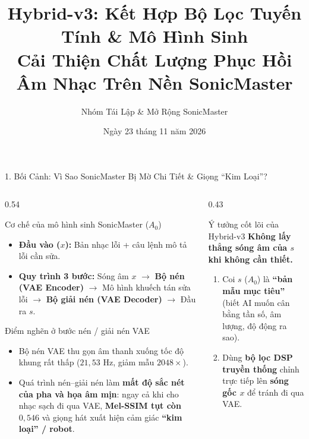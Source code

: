 \documentclass[aspectratio=169,10pt]{beamer}
\title[Hybrid-v3: Codec-Bypass Audio Restoration]{\textbf{Hybrid-v3: Kết Hợp Bộ Lọc Tuyến Tính \& Mô Hình Sinh}\\ \large Cải Thiện Chất Lượng Phục Hồi Âm Nhạc Trên Nền SonicMaster}
\author{Nhóm Tái Lập \& Mở Rộng SonicMaster}
\date{Ngày 23 tháng 11 năm 2026}
\begin{document}
\begin{frame}
  \titlepage
\end{frame}

\begin{frame}{1. Bối Cảnh: Vì Sao SonicMaster Bị Mờ Chi Tiết \& Giọng ``Kim Loại''?}
  \begin{columns}[T]
    \begin{column}{0.54\textwidth}
      \footnotesize
      \begin{block}{Cơ chế của mô hình sinh SonicMaster ($A_0$)}
        \begin{itemize}
          \item \textbf{Đầu vào ($x$):} Bản nhạc lỗi + câu lệnh mô tả lỗi cần sửa.
          \item \textbf{Quy trình 3 bước:} Sóng âm $x$ $\rightarrow$ \textbf{Bộ nén (VAE Encoder)} $\rightarrow$ Mô hình khuếch tán sửa lỗi $\rightarrow$ \textbf{Bộ giải nén (VAE Decoder)} $\rightarrow$ Đầu ra $s$.
        \end{itemize}
      \end{block}
      \begin{alertblock}{Điểm nghẽn ở bước nén / giải nén VAE}
        \begin{itemize}
          \item Bộ nén VAE thu gọn âm thanh xuống tốc độ khung rất thấp ($21{,}53\text{ Hz}$, giảm mẫu $2048\times$).
          \item Quá trình nén--giải nén làm \textbf{mất độ sắc nét của pha và họa âm mịn}: ngay cả khi cho nhạc sạch đi qua VAE, \textbf{Mel-SSIM tụt còn $0{,}546$} và giọng hát xuất hiện cảm giác \textbf{``kim loại'' / robot}.
        \end{itemize}
      \end{alertblock}
    \end{column}
    \begin{column}{0.43\textwidth}
      \footnotesize
      \begin{exampleblock}{Ý tưởng cốt lõi của Hybrid-v3}
        \textbf{Không lấy thẳng sóng âm của $s$ khi không cần thiết.}
        \begin{enumerate}
          \item Coi $s$ ($A_0$) là \textbf{``bản mẫu mục tiêu''} (biết AI muốn cân bằng tần số, âm lượng, độ động ra sao).
          \item Dùng \textbf{bộ lọc DSP truyền thống} chỉnh trực tiếp lên \textbf{sóng gốc $x$} để tránh đi qua VAE.

\end{enumerate}
\end{exampleblock}
\end{column}
\end{columns}
\end{frame}
\end{document}
